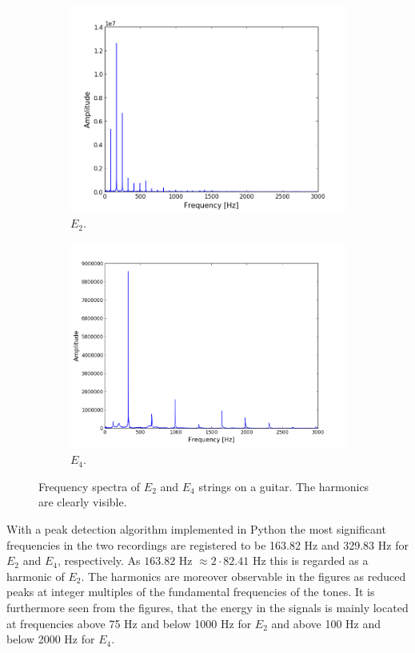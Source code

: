 \begin{figure}[H]
\centering
\begin{subfigure}{0.49\textwidth}
\centering
\includegraphics[width=\textwidth]{figures/freqanal/single_low.png}
\caption{$E_2$.}
\label{fig:single_low}
\end{subfigure}
\begin{subfigure}{0.49\textwidth}
\centering
\includegraphics[width=\textwidth]{figures/freqanal/single_high.png}
\caption{$E_4$.}
\label{fig:single_high}
\end{subfigure}
\caption{Frequency spectra of $E_2$ and $E_4$ strings on a guitar. The harmonics are clearly visible.}
\label{fig:single}
\end{figure}
With a peak detection algorithm implemented in Python the most significant frequencies in the two recordings are registered to be 163.82 Hz and 329.83 Hz for $E_2$ and $E_4$, respectively. As $163.82$ Hz $\approx 2\cdot82.41$ Hz this is regarded as a harmonic of $E_2$. The harmonics are moreover observable in the figures as reduced peaks at integer multiples of the fundamental frequencies of the tones. It is furthermore seen from the figures, that the energy in the signals is mainly located at frequencies above 75 Hz and below 1000 Hz for $E_2$ and above 100 Hz and below 2000 Hz for $E_4$.\\ 

